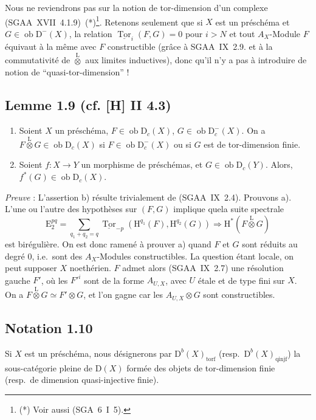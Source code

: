\documentclass[11pt]{article}
\renewcommand{\H}{\mathrm{H}}
\DeclareMathOperator{\Tor}{Tor}
\newcommand{\D}{\mathrm{D}}
\newcommand{\E}{\mathrm{E}}
\newcommand{\ob}{\operatorname{ob}}
\providecommand{\ob}{\operatorname{ob}}
\begin{document}
Nous ne reviendrons pas sur la notion de tor-dimension d'un complexe (SGAA~XVII~4.1.9)~(*)\footnote{(*) Voir aussi (SGA~6~I~5).}. Retenons seulement que si $X$ est un préschéma et $G \in \ob \D^{-}(X)$, la relation $\underline{\Tor}_i(F,G) = 0$ pour $i > N$ et tout $A_X$-Module $F$ équivaut à la même avec $F$ constructible (grâce à SGAA~IX~2.9. et à la commutativité de $\mathop{\otimes}\limits^{\mathrm{L}}$ aux limites inductives), donc qu'il n'y a pas à introduire de notion de ``quasi-tor-dimension'' !

\subsection*{Lemme 1.9 (cf. [H] II 4.3)}
\begin{enumerate}
\item[a)] Soient $X$ un préschéma, $F \in \ob \D_c(X)$, $G \in \ob \D_c^{-}(X)$. On a $F \mathop{\otimes}\limits^{\mathrm{L}} G \in \ob \D_c(X)$ si $F \in \ob \D_c^{-}(X)$ ou si $G$ est de tor-dimension finie.
\item[b)] Soient $f : X \to Y$ un morphisme de préschémas, et $G \in \ob \D_c(Y)$. Alors, $f^{*}(G) \in \ob \D_c(X)$.
\end{enumerate}

\emph{Preuve} : L'assertion b) résulte trivialement de (SGAA~IX~2.4). Prouvons a). L'une ou l'autre des hypothèses sur $(F,G)$ implique quela suite spectrale
\[
\E_2^{pq} = \sum_{q_1+q_2=q} \underline{\Tor}_{-p}(\H^{q_1}(F), \H^{q_2}(G)) \Rightarrow \H^{*}(F \mathop{\otimes}\limits^{\mathrm{L}} G)
\]
est birégulière. On est donc ramené à prouver a) quand $F$ et $G$ sont réduits au degré $0$, i.e.~sont des $A_X$-Modules constructibles. La question étant locale, on peut supposer $X$ noethérien. $F$ admet alors (SGAA~IX~2.7) une résolution gauche $F'$, où les $F'^i$ sont de la forme $A_{U,X}$, avec $U$ étale et de type fini sur $X$. On a $F \mathop{\otimes}\limits^{\mathrm{L}} G \simeq F' \otimes G$, et l'on gagne car les $A_{U,X} \otimes G$ sont constructibles.

\subsection*{Notation 1.10}
Si $X$ est un préschéma, nous désignerons par $\D^{b}(X)_{\mathrm{torf}}$ (resp.~$\D^{b}(X)_{\mathrm{qinjf}}$) la sous-catégorie pleine de $\D(X)$ formée des objets de tor-dimension finie (resp.~de dimension quasi-injective finie).
\end{document}
